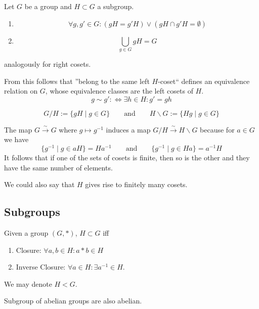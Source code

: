 \begin{proposition}
   Let \(G\) be a group and \(H \subset G\) a subgroup.
   \begin{enumerate}[label=\roman*, align=Center]
      \item \[\forall g, g' \in G: (gH = g'H) \lor (gH \cap g'H = \emptyset)\]
      \item \[\bigcup_{g \in G} gH = G\]
   \end{enumerate}
   analogously for right cosets.
\end{proposition}
\begin{remark}
   From this follows that ''belong to the same left \(H\)-coset`` defines an equivalence relation on \(G\), whose equivalence classes are the left cosets of \(H\).
\[g \sim g' :\iff \exists h \in H: g' = gh\]
\end{remark}

\begin{definition}
   \[G/H := \{gH \mid g \in G\} \qquad\text{and}\qquad H\backslash G := \{Hg \mid g \in G\}\]
\end{definition}
\begin{remark}
   The map \(G \xrightarrow{\sim} G\) where \(g \mapsto g^{-1}\) induces a map \(G/H \xrightarrow{\sim} H\backslash G\) because for \(a \in G\) we have
   \[\{g^{-1} \mid g \in aH\} = Ha^{-1} \qquad\text{and}\qquad \{g^{-1} \mid g \in Ha\} = a^{-1}H\]
   It follows that if one of the sets of cosets is finite, then so is the other and they have the same number of elements.

   We could also say that \(H\) gives rise to finitely many cosets.
\end{remark}

\subsection{Subgroups}
\begin{definition}[Subgroup]
   Given a group \((G, \ast)\), \(H \subset G\) iff
   \begin{enumerate}[label=\roman*, align=Center]
      \item Closure: \(\forall a, b \in H: a \ast b \in H\)
      \item Inverse Closure: \(\forall a \in H: \exists a^{-1} \in H\).
   \end{enumerate}
\end{definition}
\begin{remark}[Notation]
   We may denote \(H < G\).
\end{remark}
\begin{remark}
   Subgroup of abelian groups are also abelian.
\end{remark}

